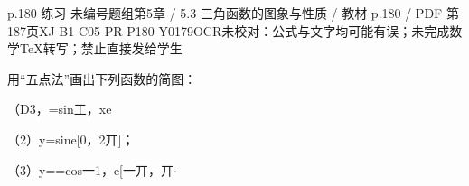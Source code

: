 \begin{bankitem}{p.180 练习 未编号题组}{第5章 / 5.3 三角函数的图象与性质 / 教材 p.180 / PDF 第187页}{XJ-B1-C05-PR-P180-Y0179}{OCR未校对：公式与文字均可能有误；未完成数学TeX转写；禁止直接发给学生}
\begin{ocrdraft}
\par
用“五点法”画出下列函数的简图：
\par
（D3，=sin工，xe
\par
（2）y=sine[0，2丌]；
\par
（3）y==cos一1，e[一丌，丌\ensuremath{\cdot}
\end{ocrdraft}
\end{bankitem}
